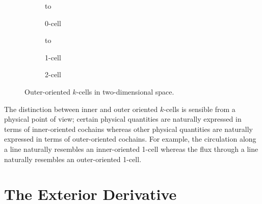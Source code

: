 \begin{figure}[ht]
    \newsavebox\outerBox
    \centering
    \begin{subfigure}[c]{0.3\textwidth}
        \centering
        \vbox to \ht{}
        \caption{0-cell}
    \end{subfigure}
    \begin{subfigure}[c]{0.3\textwidth}
        \centering
        \vbox to \ht{}
        \caption{1-cell}
    \end{subfigure}
    \begin{subfigure}[c]{0.3\textwidth}
        \centering
        \usebox{\outerBox}
        \caption{2-cell}
    \end{subfigure}
    \caption{Outer-oriented $k$-cells in two-dimensional space.}
    \label{fig:outerExample}
\end{figure}

The distinction between inner and outer oriented $k$-cells is sensible from a physical point of view; certain physical quantities are naturally expressed in terms of inner-oriented cochains whereas other physical quantities are naturally expressed in terms of outer-oriented cochains. For example, the circulation along a line naturally resembles an inner-oriented 1-cell whereas the flux through a line naturally resembles an outer-oriented 1-cell.

\section{The Exterior Derivative}

